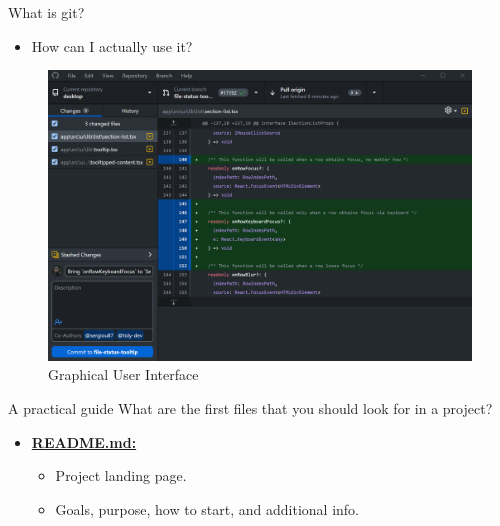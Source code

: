 \begin{frame}{What is git?}

\begin{itemize}
    \item How can I actually use it?
\end{itemize}


\begin{figure}
    \centering
    \includegraphics[width=0.50\linewidth]{assets/gui_commands.png}
    \caption{Graphical User Interface}
    \label{fig:GUI}
\end{figure}

\end{frame}


\begin{frame}{A practical guide}
    What are the first files that you should look for in a project?
    \begin{itemize}
    \item \href{https://github.com/firstcontributions/first-contributions/blob/main/README.md}{\textbf{README.md:}}
        \begin{itemize}
            \item Project landing page.
            \item Goals, purpose, how to start, and additional info.
        \end{itemize}
    \end{itemize}

\end{frame}

